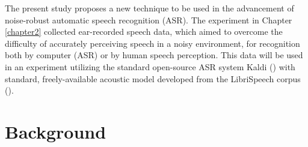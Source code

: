 The present study proposes a new technique to be used in the advancement of noise-robust automatic speech recognition (ASR).
The experiment in Chapter \ref{chapter2} collected ear-recorded speech data, which aimed to overcome the difficulty of accurately perceiving speech in a noisy environment, for recognition both by computer (ASR) or by human speech perception.  This data will be used in an experiment utilizing the standard open-source ASR system Kaldi (\cite{povey:11}) with \DIFdelbegin {}\DIFdelend \DIFaddbegin {}\DIFaddend standard, freely-available acoustic model developed from the LibriSpeech corpus (\cite{panayotov:15}).


\section{Background}
\label{chap4:background}


